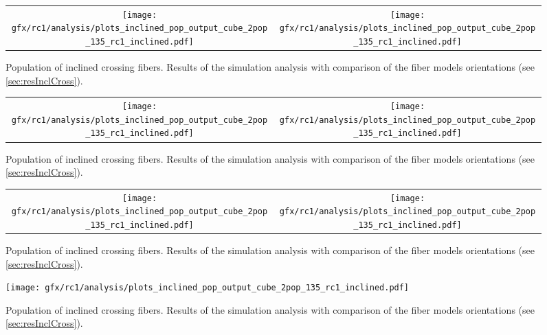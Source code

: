 %
\begin{sidewaysfigure}[!p]
    \centering
    \begin{tabular}{cc}
    \texttt{[image: gfx/rc1/analysis/plots\_inclined\_pop\_output\_cube\_2pop\_135\_rc1\_inclined.pdf]} &
    \texttt{[image: gfx/rc1/analysis/plots\_inclined\_pop\_output\_cube\_2pop\_135\_rc1\_inclined.pdf]}
    \end{tabular}
    \caption{Population of inclined crossing fibers. Results of the simulation analysis with comparison of the fiber models orientations (see \cref{sec:resInclCross}).}
    \label{app:incl_fiber_pop_b}
\end{sidewaysfigure}
%
\begin{sidewaysfigure}[!p]
    \centering
    \begin{tabular}{cc}
    \texttt{[image: gfx/rc1/analysis/plots\_inclined\_pop\_output\_cube\_2pop\_135\_rc1\_inclined.pdf]} &
    \texttt{[image: gfx/rc1/analysis/plots\_inclined\_pop\_output\_cube\_2pop\_135\_rc1\_inclined.pdf]}
    \end{tabular}
    \caption{Population of inclined crossing fibers. Results of the simulation analysis with comparison of the fiber models orientations (see \cref{sec:resInclCross}).}
    \label{app:incl_fiber_pop_c}
\end{sidewaysfigure}
%
\begin{sidewaysfigure}[!p]
    \centering
    \begin{tabular}{cc}
    \texttt{[image: gfx/rc1/analysis/plots\_inclined\_pop\_output\_cube\_2pop\_135\_rc1\_inclined.pdf]} &
    \texttt{[image: gfx/rc1/analysis/plots\_inclined\_pop\_output\_cube\_2pop\_135\_rc1\_inclined.pdf]}
    \end{tabular}
    \caption{Population of inclined crossing fibers. Results of the simulation analysis with comparison of the fiber models orientations (see \cref{sec:resInclCross}).}
    \label{app:incl_fiber_pop_d}
\end{sidewaysfigure}
%
\begin{figure}[!p]
    \centering
    \texttt{[image: gfx/rc1/analysis/plots\_inclined\_pop\_output\_cube\_2pop\_135\_rc1\_inclined.pdf]}
    \caption{Population of inclined crossing fibers. Results of the simulation analysis with comparison of the fiber models orientations (see \cref{sec:resInclCross}).}
    \label{app:incl_fiber_pop_e}
\end{figure}